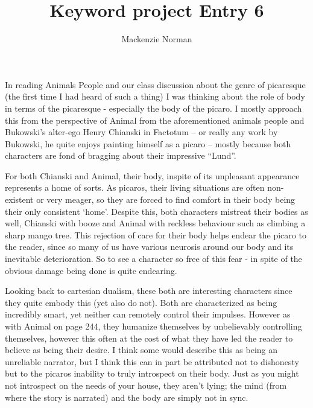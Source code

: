 \documentclass{article}
\title{Keyword project Entry 6}
\author{Mackenzie Norman}
\begin{document}
\maketitle

In reading Animals People and our class discussion about the genre of picaresque (the first time I had heard of such a thing) I was thinking about the role of body in terms of the picaresque - especially the body of the picaro. I mostly approach this from the perspective of Animal from the aforementioned animals people and Bukowski's alter-ego Henry Chianski in Factotum -- or really any work by Bukowski, he quite enjoys painting himself as a picaro -- mostly because both characters are fond of bragging about their impressive ``Lund''. 

For both Chianski and Animal, their body, inspite of its unpleasant appearance represents a home of sorts. As picaros, their living situations are often non-existent or very meager, so they are forced to find comfort in their body being their only consistent `home'. Despite this, both characters mistreat their bodies as well, Chianski with booze and Animal with reckless behaviour such as climbing a sharp mango tree. This rejection of care for their body helps endear the picaro to the reader, since so many of us have various neurosis around our body and its inevitable deterioration. So to see a character so free of this fear - in spite of the obvious damage being done is quite endearing. 

Looking back to cartesian dualism, these both are interesting characters since they quite embody this (yet also do not). Both are characterized as being incredibly smart, yet neither can remotely control their impulses. However as with Animal on page 244, they humanize themselves by unbelievably controlling themselves, however this often at the cost of what they have led the reader to believe as being their desire. I think some would describe this as being an unreliable narrator, but I think this can in part be attributed not to dishonesty but to the picaros inability to truly introspect on their body. Just as you might not introspect on the needs of your house, they aren't lying; the mind (from where the story is narrated) and the body are simply not in sync. 
\end{document}
